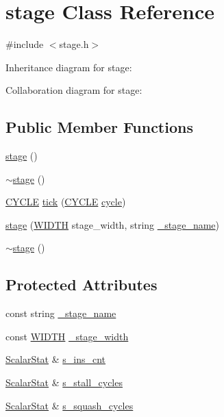 \hypertarget{classstage}{
\section{stage Class Reference}
\label{classstage}
}


{\ttfamily \#include $<$stage.h$>$}



Inheritance diagram for stage:


Collaboration diagram for stage:
\subsection*{Public Member Functions}
\begin{DoxyCompactItemize}
\item 
\hyperlink{classstage_abc77b1bb1d0891e47dfaffe9b0203e8d}{stage} ()
\item 
\hyperlink{classstage_a680eded15b373eaba43a71a68c97bb73}{$\sim$stage} ()
\item 
\hyperlink{global_2global_8h_a7e19a550ec11d1ed921deb20c22efb5b}{CYCLE} \hyperlink{classstage_a362592f44e2c66fee59e39258380c285}{tick} (\hyperlink{global_2global_8h_a7e19a550ec11d1ed921deb20c22efb5b}{CYCLE} \hyperlink{vliwScheduler_8cpp_a1f4871d45089b039d95d3832dd123827}{cycle})
\item 
\hyperlink{classstage_ae8812f533c2c07facb960002aedcb6ab}{stage} (\hyperlink{global_2global_8h_a6fa2e24b8a418fa215e183264cbea3aa}{WIDTH} stage\_\-width, string \hyperlink{classstage_ad8500743b9a08a7d3b7a16e2c9ee7bca}{\_\-stage\_\-name})
\item 
\hyperlink{classstage_a680eded15b373eaba43a71a68c97bb73}{$\sim$stage} ()
\end{DoxyCompactItemize}
\subsection*{Protected Attributes}
\begin{DoxyCompactItemize}
\item 
const string \hyperlink{classstage_ad8500743b9a08a7d3b7a16e2c9ee7bca}{\_\-stage\_\-name}
\item 
const \hyperlink{global_2global_8h_a6fa2e24b8a418fa215e183264cbea3aa}{WIDTH} \hyperlink{classstage_a758da5ef14d0eca96290d4feaad91302}{\_\-stage\_\-width}
\item 
\hyperlink{classScalarStat}{ScalarStat} \& \hyperlink{classstage_a41c52c3b31e0cd1729c3665bbacb4f5d}{s\_\-ins\_\-cnt}
\item 
\hyperlink{classScalarStat}{ScalarStat} \& \hyperlink{classstage_a257d798bacbed096d4e9879d4d47c207}{s\_\-stall\_\-cycles}
\item 
\hyperlink{classScalarStat}{ScalarStat} \& \hyperlink{classstage_a8936cf4c32fa9d9f27ca8d3306468cc8}{s\_\-squash\_\-cycles}
\end{DoxyCompactItemize}


